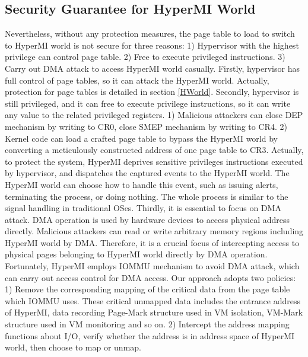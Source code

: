\documentclass[conference]{IEEEtran}
\begin{document}
\subsection{Security Guarantee for HyperMI World}\label {SG}
Nevertheless, without any protection measures, the page table to load to switch to HyperMI world is not secure for three reasons: 1) Hypervisor with the highest privilege can control page table. 2) Free to execute privileged instructions. 3) Carry out DMA attack to access HyperMI world casually.
Firstly, hypervisor has full control of page tables, so it can attack the HyperMI world. Actually, protection for page tables is detailed in section \ref{HWorld}. 
Secondly, hypervisor is still privileged, and it can free to execute privilege instructions, so it can write any value to the related privileged registers. 1) Malicious attackers can close DEP mechanism by writing to CR0, close SMEP mechanism by writing to CR4. 2) Kernel code can load a crafted page table to bypass the HyperMI world by converting a meticulously constructed address of one page table to CR3.
Actually, to protect the system, HyperMI deprives sensitive privileges instructions executed by hypervisor, and dispatches the captured events to the HyperMI world. The HyperMI world can choose how to handle this event, such as issuing alerts, terminating the process, or doing nothing. The whole process is similar to the signal handling in traditional OSes.
Thirdly, it is essential to focus on DMA attack. DMA operation is used by hardware devices to access physical address directly. Malicious attackers can read or write arbitrary memory regions including HyperMI world by DMA. Therefore, it is a crucial focus of intercepting access to physical pages belonging to HyperMI world directly by DMA operation. 
Fortunately, HyperMI employs IOMMU mechanism to avoid DMA attack, which can carry out access control for DMA access. Our approach adopts two policies: 1) Remove the corresponding mapping of the critical data from the page table which IOMMU uses. These critical unmapped data includes the entrance address of HyperMI, data recording Page-Mark structure used in VM isolation, VM-Mark structure used in VM monitoring and so on. 2) Intercept the address mapping functions about I/O, verify whether the address is in address space of HyperMI world, then choose to map or unmap.
\end{document}
